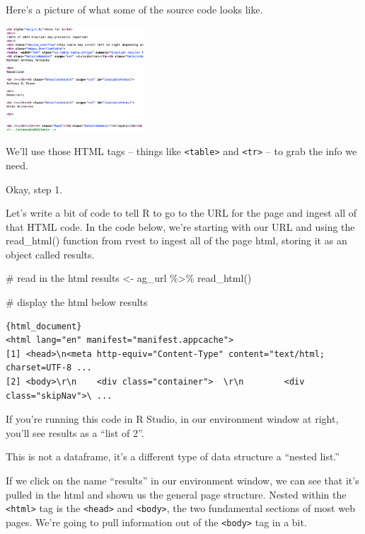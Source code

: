 \documentclass[
  letterpaper,
  DIV=11,
  numbers=noendperiod]{scrreprt}
\newenvironment{Shaded}{\begin{snugshade}}{\end{snugshade}}
\newcommand{\CommentTok}[1]{\textcolor[rgb]{0.37,0.37,0.37}{#1}}
\newcommand{\FunctionTok}[1]{\textcolor[rgb]{0.28,0.35,0.67}{#1}}
\newcommand{\NormalTok}[1]{\textcolor[rgb]{0.00,0.23,0.31}{#1}}
\newcommand{\OtherTok}[1]{\textcolor[rgb]{0.00,0.23,0.31}{#1}}
\newcommand{\SpecialCharTok}[1]{\textcolor[rgb]{0.37,0.37,0.37}{#1}}
\begin{document}
Here's a picture of what some of the source code looks like.

\includegraphics[width=2.03in,height=\textheight]{./images/rvest2.png}

We'll use those HTML tags -- things like
\texttt{\textless{}table\textgreater{}} and
\texttt{\textless{}tr\textgreater{}} -- to grab the info we need.

Okay, step 1.

Let's write a bit of code to tell R to go to the URL for the page and
ingest all of that HTML code. In the code below, we're starting with our
URL and using the read\_html() function from rvest to ingest all of the
page html, storing it as an object called results.

\begin{Shaded}
\begin{Highlighting}[]
\CommentTok{\# read in the html}
\NormalTok{results }\OtherTok{\textless{}{-}}\NormalTok{ ag\_url }\SpecialCharTok{\%\textgreater{}\%}
  \FunctionTok{read\_html}\NormalTok{()}

\CommentTok{\# display the html below}
\NormalTok{results}
\end{Highlighting}
\end{Shaded}

\begin{verbatim}
{html_document}
<html lang="en" manifest="manifest.appcache">
[1] <head>\n<meta http-equiv="Content-Type" content="text/html; charset=UTF-8 ...
[2] <body>\r\n    <div class="container">  \r\n        <div class="skipNav">\ ...
\end{verbatim}

If you're running this code in R Studio, in our environment window at
right, you'll see results as a ``list of 2''.

This is not a dataframe, it's a different type of data structure a
``nested list.''

If we click on the name ``results'' in our environment window, we can
see that it's pulled in the html and shown us the general page
structure. Nested within the \texttt{\textless{}html\textgreater{}} tag
is the \texttt{\textless{}head\textgreater{}} and
\texttt{\textless{}body\textgreater{}}, the two fundamental sections of
most web pages. We're going to pull information out of the
\texttt{\textless{}body\textgreater{}} tag in a bit.
\end{document}
